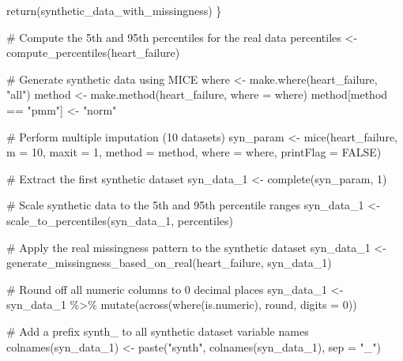 \documentclass[
  letterpaper,
  DIV=11,
  numbers=noendperiod]{scrartcl}
\newenvironment{Shaded}{\begin{snugshade}}{\end{snugshade}}
\newcommand{\AttributeTok}[1]{\textcolor[rgb]{0.40,0.45,0.13}{#1}}
\newcommand{\CommentTok}[1]{\textcolor[rgb]{0.37,0.37,0.37}{#1}}
\newcommand{\ConstantTok}[1]{\textcolor[rgb]{0.56,0.35,0.01}{#1}}
\newcommand{\DecValTok}[1]{\textcolor[rgb]{0.68,0.00,0.00}{#1}}
\newcommand{\FunctionTok}[1]{\textcolor[rgb]{0.28,0.35,0.67}{#1}}
\newcommand{\NormalTok}[1]{\textcolor[rgb]{0.00,0.23,0.31}{#1}}
\newcommand{\OtherTok}[1]{\textcolor[rgb]{0.00,0.23,0.31}{#1}}
\newcommand{\SpecialCharTok}[1]{\textcolor[rgb]{0.37,0.37,0.37}{#1}}
\newcommand{\StringTok}[1]{\textcolor[rgb]{0.13,0.47,0.30}{#1}}
\begin{document}
\begin{Shaded}
\begin{Highlighting}[]
  \FunctionTok{return}\NormalTok{(synthetic\_data\_with\_missingness)}
\NormalTok{\}}

\CommentTok{\# Compute the 5th and 95th percentiles for the real data}
\NormalTok{percentiles }\OtherTok{\textless{}{-}} \FunctionTok{compute\_percentiles}\NormalTok{(heart\_failure)}

\CommentTok{\# Generate synthetic data using MICE}
\NormalTok{where }\OtherTok{\textless{}{-}} \FunctionTok{make.where}\NormalTok{(heart\_failure, }\StringTok{"all"}\NormalTok{)}
\NormalTok{method }\OtherTok{\textless{}{-}} \FunctionTok{make.method}\NormalTok{(heart\_failure, }\AttributeTok{where =}\NormalTok{ where)}
\NormalTok{method[method }\SpecialCharTok{==} \StringTok{"pmm"}\NormalTok{] }\OtherTok{\textless{}{-}} \StringTok{"norm"}

\CommentTok{\# Perform multiple imputation (10 datasets)}
\NormalTok{syn\_param }\OtherTok{\textless{}{-}} \FunctionTok{mice}\NormalTok{(heart\_failure, }\AttributeTok{m =} \DecValTok{10}\NormalTok{, }\AttributeTok{maxit =} \DecValTok{1}\NormalTok{, }\AttributeTok{method =}\NormalTok{ method, }\AttributeTok{where =}\NormalTok{ where, }\AttributeTok{printFlag =} \ConstantTok{FALSE}\NormalTok{)}

\CommentTok{\# Extract the first synthetic dataset}
\NormalTok{syn\_data\_1 }\OtherTok{\textless{}{-}} \FunctionTok{complete}\NormalTok{(syn\_param, }\DecValTok{1}\NormalTok{)}

\CommentTok{\# Scale synthetic data to the 5th and 95th percentile ranges}
\NormalTok{syn\_data\_1 }\OtherTok{\textless{}{-}} \FunctionTok{scale\_to\_percentiles}\NormalTok{(syn\_data\_1, percentiles)}

\CommentTok{\# Apply the real missingness pattern to the synthetic dataset}
\NormalTok{syn\_data\_1 }\OtherTok{\textless{}{-}} \FunctionTok{generate\_missingness\_based\_on\_real}\NormalTok{(heart\_failure, syn\_data\_1)}

\CommentTok{\# Round off all numeric columns to 0 decimal places}
\NormalTok{syn\_data\_1 }\OtherTok{\textless{}{-}}\NormalTok{ syn\_data\_1 }\SpecialCharTok{\%\textgreater{}\%}
  \FunctionTok{mutate}\NormalTok{(}\FunctionTok{across}\NormalTok{(}\FunctionTok{where}\NormalTok{(is.numeric), round, }\AttributeTok{digits =} \DecValTok{0}\NormalTok{))}

\CommentTok{\# Add a prefix \textquotesingle{}synth\_\textquotesingle{} to all synthetic dataset variable names}
\FunctionTok{colnames}\NormalTok{(syn\_data\_1) }\OtherTok{\textless{}{-}} \FunctionTok{paste}\NormalTok{(}\StringTok{"synth"}\NormalTok{, }\FunctionTok{colnames}\NormalTok{(syn\_data\_1), }\AttributeTok{sep =} \StringTok{"\_"}\NormalTok{)}


\end{Highlighting}
\end{Shaded}
\end{document}
